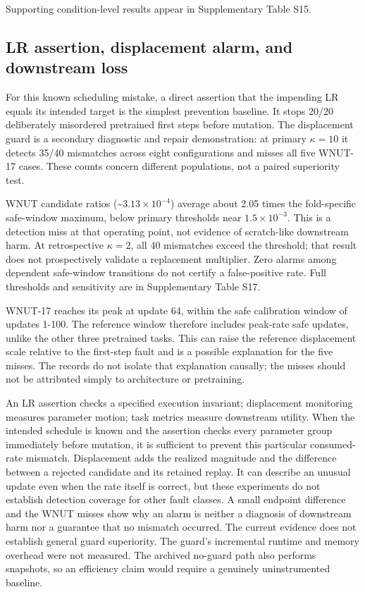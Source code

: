 \documentclass[referee,pdflatex,sn-mathphys-num]{sn-jnl}
\begin{document}
Supporting condition-level results appear in Supplementary Table S15.

\subsection{LR assertion, displacement alarm, and downstream loss}\label{lr-assertion-displacement-alarm-and-downstream-loss}

For this known scheduling mistake, a direct assertion that the impending LR equals its intended target is the simplest prevention baseline. It stops 20/20 deliberately misordered pretrained first steps before mutation. The displacement guard is a secondary diagnostic and repair demonstration: at primary \(\kappa=10\) it detects 35/40 mismatches across eight configurations and misses all five WNUT-17 cases. These counts concern different populations, not a paired superiority test.

WNUT candidate ratios (\textasciitilde{}\(3.13\times10^{-4}\)) average about 2.05 times the fold-specific safe-window maximum, below primary thresholds near \(1.5\times10^{-3}\). This is a detection miss at that operating point, not evidence of scratch-like downstream harm. At retrospective \(\kappa=2\), all 40 mismatches exceed the threshold; that result does not prospectively validate a replacement multiplier. Zero alarms among dependent safe-window transitions do not certify a false-positive rate. Full thresholds and sensitivity are in Supplementary Table S17.

WNUT-17 reaches its peak at update 64, within the safe calibration window of updates 1-100. The reference window therefore includes peak-rate safe updates, unlike the other three pretrained tasks. This can raise the reference displacement scale relative to the first-step fault and is a possible explanation for the five misses. The records do not isolate that explanation causally; the misses should not be attributed simply to architecture or pretraining.

An LR assertion checks a specified execution invariant; displacement monitoring measures parameter motion; task metrics measure downstream utility. When the intended schedule is known and the assertion checks every parameter group immediately before mutation, it is sufficient to prevent this particular consumed-rate mismatch. Displacement adds the realized magnitude and the difference between a rejected candidate and its retained replay. It can describe an unusual update even when the rate itself is correct, but these experiments do not establish detection coverage for other fault classes. A small endpoint difference and the WNUT misses show why an alarm is neither a diagnosis of downstream harm nor a guarantee that no mismatch occurred. The current evidence does not establish general guard superiority. The guard's incremental runtime and memory overhead were not measured. The archived no-guard path also performs snapshots, so an efficiency claim would require a genuinely uninstrumented baseline.
\end{document}
